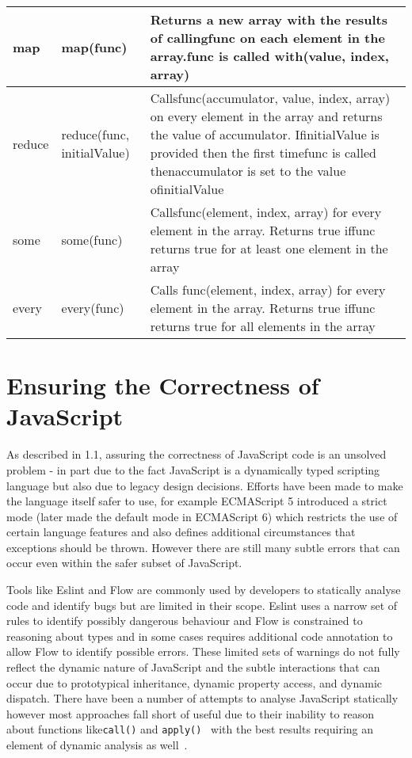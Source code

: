 \documentclass[]{final_report}
\begin{document}
{\begin{landscape}
\begin{table}[h]
{\begin{tabular}{|l|l|l|}
map &map(func) & Returns a new array with the results of callingfunc on each element in the array.func is called with(value, index, array) \\ \hline
reduce &reduce(func, initialValue) & Callsfunc(accumulator, value, index, array) on every element in the array and returns the value of accumulator. IfinitialValue is provided then the first timefunc is called thenaccumulator is set to the value ofinitialValue \\ \hline
some &some(func) & Callsfunc(element, index, array) for every element in the array. Returns true iffunc returns true for at least one element in the array \\ \hline
every &every(func) & Calls func(element, index, array) for every element in the array. Returns true iffunc returns true for all elements in the array \\ \hline
\end{tabular}
}
\end{table}
\end{landscape}
    \clearpage%
}


\section{Ensuring the Correctness of JavaScript}
As described in 1.1, assuring the correctness of JavaScript code is an unsolved problem - in part due to the fact JavaScript is a dynamically typed scripting language but also due to legacy design decisions. Efforts have been made to make the language itself safer to use, for example ECMAScript 5 introduced a strict mode (later made the default mode in ECMAScript 6) which restricts the use of certain language features and also defines additional circumstances that exceptions should be thrown. However there are still many subtle errors that can occur even within the safer subset of JavaScript.

Tools like Eslint and Flow are commonly used by developers to statically analyse code and identify bugs but are limited in their scope. Eslint uses a narrow set of rules to identify possibly dangerous behaviour and Flow is constrained to reasoning about types and in some cases requires additional code annotation to allow Flow to identify possible errors. These limited sets of warnings do not fully reflect the dynamic nature of JavaScript and the subtle interactions that can occur due to prototypical inheritance, dynamic property access, and dynamic dispatch. There have been a number of attempts to analyse JavaScript statically however most approaches fall short of useful due to their inability to reason about functions like\lstinline{call()} and \lstinline{apply()}~\cite{sridharan2012correlation} with the best results requiring an element of dynamic analysis as well~\cite{logozzo2010rata, wei2013practical}.
\end{document}
